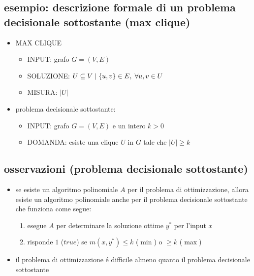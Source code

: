 \subsection*{esempio: descrizione formale di un problema decisionale sottostante (max clique)}
\begin{flushleft}
	\begin{itemize}
		\item MAX CLIQUE
		\begin{itemize}
			\item INPUT: grafo $G=(V,E)$
			\item SOLUZIONE: $U\subseteq V\hspace{0.1cm}\vert\hspace{0.1cm}\{u,v\}\in E,\hspace{0.1cm}\forall u,v\in U$
			\item MISURA: $|U|$
		\end{itemize}
		\item problema decisionale sottostante:
		\begin{itemize}
			\item INPUT: grafo $G=(V,E)$ e un intero $k>0$
			\item DOMANDA: esiste una clique $U$ in $G$ tale che $|U|\geq k$
		\end{itemize}
	\end{itemize}
\end{flushleft}


\subsection*{osservazioni (problema decisionale sottostante)}
\begin{flushleft}
	\begin{itemize}
		\item se esiste un algoritmo polinomiale $A$ per il problema di ottimizzazione, allora esiste un algoritmo polinomiale anche per il problema decisionale sottostante che funziona come segue:
			\begin{enumerate}
				\item esegue $A$ per determinare la soluzione ottime $y^*$ per l'input $x$
				\item risponde $1$ ($true$) se $m(x,y^*)\leq k$ ($\min$) o $\geq k$ ($\max$)
			\end{enumerate}
		\item il problema di ottimizzazione \'e difficile almeno quanto il problema decisionale sottostante
	\end{itemize}
\end{flushleft}

